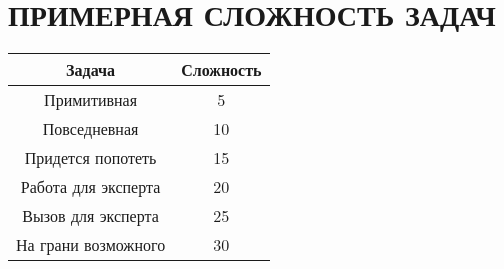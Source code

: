 \section{ПРИМЕРНАЯ СЛОЖНОСТЬ ЗАДАЧ}
\begin{center}
\begin{tabular}{ |c|c| }
\hline
 \textbf{Задача} & \textbf{Сложность} \\ 
\hline
 Примитивная & 5 \\
\hline
 Повседневная & 10 \\
\hline
 Придется попотеть & 15 \\
\hline
 Работа для эксперта & 20 \\
\hline
 Вызов для эксперта & 25 \\
\hline
 На грани возможного & 30 \\
\hline
\end{tabular}
\end{center}


